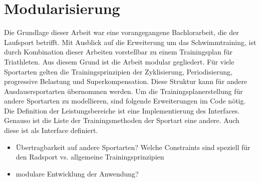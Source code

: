 \section{Modularisierung}
Die Grundlage dieser Arbeit war eine vorangegangene Bachlorarbeit, die der Laufsport betrifft. Mit Ausblick auf die Erweiterung um das Schwimmtraining, ist durch Kombination dieser Arbeiten vorstellbar zu einem Trainingsplan für Triathleten. 
Aus diesem Grund ist die Arbeit modular gegliedert.
Für viele Sportarten gelten die Trainingsprinzipien der Zyklisierung, Periodisierung, progressive Belastung und Superkompensation. Diese Struktur kann für andere Ausdauersportarten übernommen werden. Um die Trainingsplanerstellung für andere Sportarten zu modellieren, sind folgende Erweiterungen im Code nötig.
Die Definition der Leistungsbereiche ist eine Implementierung des Interfaces. Genauso ist die Liste der Trainingsmethoden der Sportart eine andere. Auch diese ist als Interface definiert. 
\begin{itemize}
    \item Übertragbarkeit auf andere Sportarten? Welche Constraints sind speziell für den Radsport vs. allgemeine Trainingsprinzipien
    \item modulare Entwicklung der Anwendung?
\end{itemize}